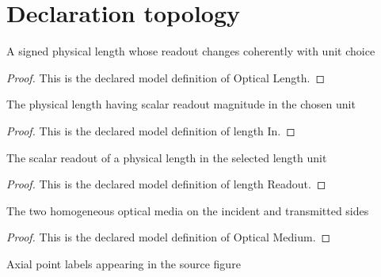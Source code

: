 \section{Declaration topology}
\begin{definition}
  \label{def:physics:phyx-mini-0040:phyxminiproblems-problemphyxmini0040-opticallength}
  A signed physical length whose readout changes coherently with unit choice
\end{definition}
\begin{proof}
  This is the declared model definition of Optical Length.
\end{proof}
\begin{definition}[length In]
  \label{def:physics:phyx-mini-0040:phyxminiproblems-problemphyxmini0040-lengthin}
  The physical length having scalar readout magnitude in the chosen unit
\end{definition}
\begin{proof}
  This is the declared model definition of length In.
\end{proof}
\begin{definition}
  \label{def:physics:phyx-mini-0040:phyxminiproblems-problemphyxmini0040-lengthreadout}
  The scalar readout of a physical length in the selected length unit
\end{definition}
\begin{proof}
  This is the declared model definition of length Readout.
\end{proof}
\begin{definition}
  \label{def:physics:phyx-mini-0040:phyxminiproblems-problemphyxmini0040-opticalmedium}
  The two homogeneous optical media on the incident and transmitted sides
\end{definition}
\begin{proof}
  This is the declared model definition of Optical Medium.
\end{proof}
\begin{definition}
  \label{def:physics:phyx-mini-0040:phyxminiproblems-problemphyxmini0040-axialpoint}
  Axial point labels appearing in the source figure
\end{definition}
